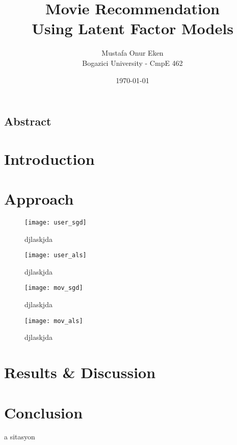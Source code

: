 \documentclass[11pt]{article}
\begin{document}

\title{\huge \textbf{Movie Recommendation\\ Using Latent Factor Models}}
\author{\Large Mustafa Onur Eken\\[1mm] Bogazici University - CmpE 462}
\date{\today}

\maketitle
\begin{centering}
	\section*{\large Abstract}
	\textit{\lipsum[1]}	
\end{centering}
\vspace{10mm}


\begin{multicols}{2}
	
	\section{Introduction}
	\lipsum[1]
	
	

	
	\section{Approach}
	\lipsum[1]
	\begin{figure*}[!ht]
		\centering
		\texttt{[image: user\_sgd]}
		\caption{djlaskjda}
		\label{1}
	\end{figure*}
	\begin{figure*}[!ht]
		\centering
		\texttt{[image: user\_als]}
		\caption{djlaskjda}
		\label{2}
	\end{figure*}
	\begin{figure*}[!ht]
		\centering
		\texttt{[image: mov\_sgd]}
		\caption{djlaskjda}
		\label{3}
	\end{figure*}
	\begin{figure*}[!ht]
		\centering
		\texttt{[image: mov\_als]}
		\caption{djlaskjda}
		\label{4}
	\end{figure*}
	
	
	
	
	\section{Results \& Discussion}
	\lipsum[1]
	\section{Conclusion}
	\lipsum[1]
	a sitasyon \cite{mnih}
	
	
	
\end{multicols}
\end{document}

